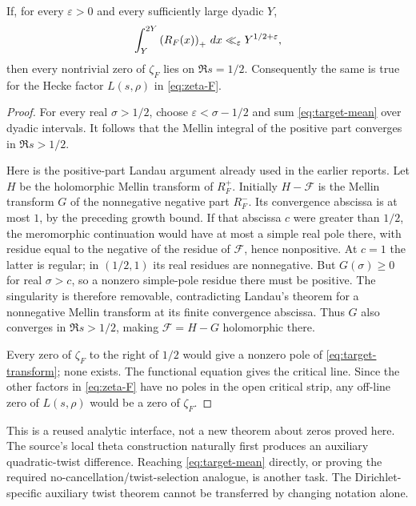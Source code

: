 \begin{proposition}\label{prop:target}
If, for every $\varepsilon>0$ and every sufficiently large dyadic $Y$,
\begin{equation}\label{eq:target-mean}
 \int_Y^{2Y}\left(R_F(x)\right)_+\,dx\ll_\varepsilon Y^{1/2+\varepsilon},
\end{equation}
then every nontrivial zero of $\zeta_F$ lies on $\Re s=1/2$. Consequently the same is true for the Hecke factor $L(s,\rho)$ in \eqref{eq:zeta-F}.
\end{proposition}

\begin{proof}
For every real $\sigma>1/2$, choose $\varepsilon<\sigma-1/2$ and sum \eqref{eq:target-mean} over dyadic intervals. It follows that the Mellin integral of the positive part converges in $\Re s>1/2$.

Here is the positive-part Landau argument already used in the earlier reports. Let $H$ be the holomorphic Mellin transform of $R_F^+$. Initially $H-\mathcal F$ is the Mellin transform $G$ of the nonnegative negative part $R_F^-$. Its convergence abscissa is at most $1$, by the preceding growth bound. If that abscissa $c$ were greater than $1/2$, the meromorphic continuation would have at most a simple real pole there, with residue equal to the negative of the residue of $\mathcal F$, hence nonpositive. At $c=1$ the latter is regular; in $(1/2,1)$ its real residues are nonnegative. But $G(\sigma)\ge0$ for real $\sigma>c$, so a nonzero simple-pole residue there must be positive. The singularity is therefore removable, contradicting Landau's theorem for a nonnegative Mellin transform at its finite convergence abscissa. Thus $G$ also converges in $\Re s>1/2$, making $\mathcal F=H-G$ holomorphic there.

Every zero of $\zeta_F$ to the right of $1/2$ would give a nonzero pole of \eqref{eq:target-transform}; none exists. The functional equation gives the critical line. Since the other factors in \eqref{eq:zeta-F} have no poles in the open critical strip, any off-line zero of $L(s,\rho)$ would be a zero of $\zeta_F$.
\end{proof}

This is a reused analytic interface, not a new theorem about zeros proved here. The source's local theta construction naturally first produces an auxiliary quadratic-twist difference. Reaching \eqref{eq:target-mean} directly, or proving the required no-cancellation/twist-selection analogue, is another task. The Dirichlet-specific auxiliary twist theorem cannot be transferred by changing notation alone.\cite{priorSynthesis,criterion}

